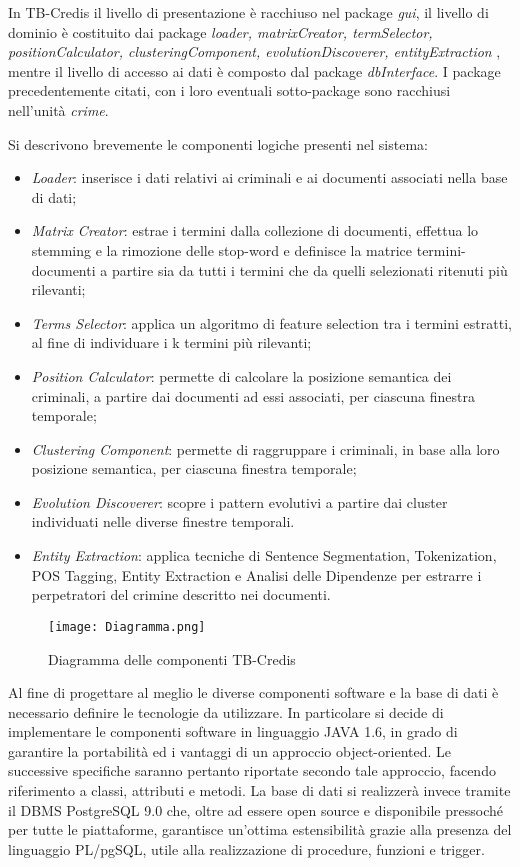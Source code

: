 In TB-Credis il livello di presentazione è racchiuso nel package \textit{gui}, il livello di dominio è
costituito dai package \textit{loader, matrixCreator, termSelector, positionCalculator, clusteringComponent, evolutionDiscoverer, entityExtraction }, mentre il livello di accesso ai dati è
composto dal package \textit{dbInterface}.
I package precedentemente citati, con i loro eventuali sotto-package sono racchiusi
nell'unità \textit{crime}.

Si descrivono brevemente le componenti logiche presenti nel sistema:
\begin{itemize}
	\item \textit{Loader}: inserisce i dati relativi ai criminali e ai documenti associati nella base di dati;
	\item \textit{Matrix Creator}: estrae i termini dalla collezione di documenti, effettua lo stemming e la rimozione delle stop-word e definisce la matrice termini-documenti a partire sia da tutti i termini che da quelli selezionati ritenuti più rilevanti;
	\item \textit{Terms Selector}: applica un algoritmo di feature selection tra i termini estratti, al fine di individuare i k termini più rilevanti;
	\item \textit{Position Calculator}: permette di calcolare la posizione semantica dei criminali, a partire dai documenti ad essi associati, per ciascuna finestra temporale;
	\item \textit{Clustering Component}: permette di raggruppare i criminali, in base alla loro posizione semantica, per ciascuna finestra temporale;
	\item \textit{Evolution Discoverer}: scopre i pattern evolutivi a partire dai cluster individuati nelle diverse finestre temporali.
	\item \textit{Entity Extraction}: applica tecniche di Sentence Segmentation, Tokenization, POS Tagging, Entity Extraction e Analisi delle Dipendenze per estrarre i perpetratori del crimine descritto nei documenti. 
\end{itemize}
	
\begin{figure}[H]
	\centering
	\texttt{[image: Diagramma.png]}
	\caption{Diagramma delle componenti TB-Credis}
	\label{AlberoDipendenze}
\end{figure}

Al fine di progettare al meglio le diverse componenti software e la base di dati è necessario definire le tecnologie da utilizzare. In particolare si decide di implementare le componenti software in linguaggio JAVA 1.6, in grado di garantire la portabilità ed i vantaggi di un approccio object-oriented. Le successive specifiche saranno pertanto riportate secondo tale approccio, facendo riferimento a classi, attributi e metodi.
La base di dati si realizzerà invece tramite il DBMS PostgreSQL 9.0 che, oltre ad essere open source e disponibile pressoché per tutte le piattaforme, garantisce un'ottima estensibilità grazie alla presenza del linguaggio PL/pgSQL, utile alla realizzazione di procedure, funzioni e trigger.


